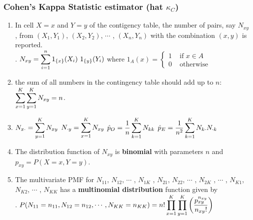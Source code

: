 \subsubsection{Cohen’s Kappa Statistic estimator (hat $\kappa_C$)}

\begin{enumerate}
    \item In cell $X = x$ and $Y = y$ of the contigency table, the number of pairs, say $N_{x y}$ , from $(X_1, Y_1)$, $(X_2, Y_2)$, $\cdots$ , $(X_n , Y_n )$ with the combination $(x, y)$ is reported.
    \hfill \cite{statistics/book/Statistics-for-Data-Scientists/Maurits-Kaptein}
    \\
    .\hfill
    $
        N_{x y} = \displaystyle\sum^n_{i=1} 1_{\left\{x\right\}}(X_i )\ 1_{\left\{y\right\}}(Y_i )
    $
    \hfill
    where
    $
        1_A(x) =
        \begin{cases}
            1 & \text{ if } x \in A \\
            0 & \text{ otherwise}
        \end{cases}
    $
    \hfill \cite{statistics/book/Statistics-for-Data-Scientists/Maurits-Kaptein}

    \item  the sum of all numbers in the contingency table should add up to $n$: $\displaystyle\sum^K_{x=1} \displaystyle\sum^K_{y=1} N_{x y} = n$.
    \hfill \cite{statistics/book/Statistics-for-Data-Scientists/Maurits-Kaptein}

    \item
    $N_{x\cdot} = \displaystyle\sum^K_{y=1} N_{x y}$
    \hfill
    $N_{\cdot y} = \displaystyle\sum^K_{x=1} N_{x y}$
    \hfill
    $\hat{p}_O = \dfrac{1}{ n} \displaystyle\sum^K_{k=1} N_{kk} $
    \hfill
    $\hat{p}_E = \dfrac{1}{ n^2} \displaystyle\sum^K_{k=1} N_{k\cdot}N_{\cdot k} $
    \hfill \cite{statistics/book/Statistics-for-Data-Scientists/Maurits-Kaptein}

    \item The distribution function of $N_{x y}$ is \textbf{binomial} with parameters $n$ and $p_{x y} = P(X = x, Y = y)$.
    \hfill \cite{statistics/book/Statistics-for-Data-Scientists/Maurits-Kaptein}

    \item The multivariate PMF for $N_{11}$, $N_{12}$, $\cdots$ , $N_{1K}$ , $N_{21}$, $N_{22}$, $\cdots$ , $N_{2K}$ , $\cdots$ , $N_{K 1}$, $N_{K 2}$, $\cdots$ , $N_{K K}$ has a \textbf{multinomial distribution} function given by
    \hfill \cite{statistics/book/Statistics-for-Data-Scientists/Maurits-Kaptein}
    \\
    .\hfill
    $
        P(N_{11} = n_{11}, N_{12} = n_{12}, \cdots , N_{K K} = n_{K K} )
        = n! \displaystyle\prod^K_{x=1} \displaystyle\prod^K_{y=1} \left(\dfrac{p^{n_{x y}}_{x y}}{n_{x y} !}\right)
    $
    \hfill \cite{statistics/book/Statistics-for-Data-Scientists/Maurits-Kaptein}


\end{enumerate}
